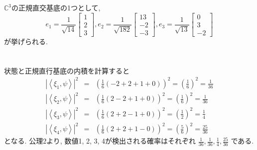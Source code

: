 \documentclass[a4paper,11pt]{jsarticle}
\begin{document}
\section{}
$\mathbb{C}^3$の正規直交基底の1つとして, 
\[
  e_1 = \frac{1}{\sqrt{14}}\begin{bmatrix}
    1 \\ 2 \\ 3
  \end{bmatrix}, 
  e_2 = \frac{1}{\sqrt{182}}\begin{bmatrix}
    13 \\ -2 \\ -3
  \end{bmatrix},
  e_3 = \frac{1}{\sqrt{13}}\begin{bmatrix}
    0 \\ 3 \\ -2
  \end{bmatrix}
\]
が挙げられる.

\section{}

状態と正規直行基底の内積を計算すると
\begin{eqnarray*}
  |\left<\xi_1, \psi\right>|^2
  &=& \left(\frac{1}{6}(-2 + 2 + 1 + 0)\right)^2
  = \left(\frac{1}{6}\right)^2 = \frac{1}{36} \\
  |\left<\xi_2, \psi\right>|^2
  &=& \left(\frac{1}{6}(2 - 2 + 1 + 0)\right)^2
  = \left(\frac{1}{6}\right)^2 = \frac{1}{36} \\
  |\left<\xi_3, \psi\right>|^2
  &=& \left(\frac{1}{6}(2 + 2 - 1 + 0)\right)^2
  = \left(\frac{1}{2}\right)^2 = \frac{1}{4} \\
  |\left<\xi_4, \psi\right>|^2
  &=& \left(\frac{1}{6}(2 + 2 + 1 - 0)\right)^2
  = \left(\frac{5}{6}\right)^2 = \frac{25}{36}
\end{eqnarray*}
となる. 公理2より, 数値1, 2, 3, 4が検出される確率はそれぞれ
$\frac{1}{36}, \frac{1}{36}, \frac{1}{4}, \frac{25}{36}$
である.
\end{document}
